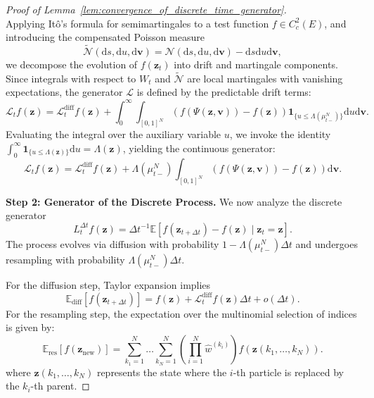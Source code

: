 \documentclass[10pt,a4paper]{amsart}
\newcommand{\dif}{{\mathrm{d}}}
\newcommand{\mathbbm}[1]{\boldsymbol{#1}}
\begin{document}
\begin{proof}[Proof of Lemma~\ref{lem:convergence_of_discrete_time_generator}]
\begin{equation*}
    \end{equation*}
    Applying It\^o's formula for semimartingales to a test function $f \in C_c^2(E)$, and introducing the compensated Poisson measure 
    $$
        \widetilde{\mathcal{N}}(\dif s,\dif u, \dif \mathbbm{v}) = \mathcal{N}(\dif s,\dif u, \dif \mathbbm{v}) - \dif s \dif u \dif \mathbbm{v},
    $$ 
    we decompose the evolution of $f(\mathbbm{z}_t)$ into drift and martingale components. Since integrals with respect to $W_t$ and $\widetilde{\mathcal{N}}$ are local martingales with vanishing expectations, the generator $\mathcal{L}$ is defined by the predictable drift terms:
    \[
    \mathcal{L}_tf(\mathbbm{z}) = \mathcal{L}^{\text{diff}}_tf(\mathbbm{z}) + \int_0^\infty \int_{[0,1]^N} \left( f(\Psi(\mathbbm{z}, \mathbbm{v})) - f(\mathbbm{z}) \right) \mathbbm{1}_{\{u \le \Lambda(\mu^N_{t-})\}} \dif u  \dif \mathbbm{v}.
    \]
    Evaluating the integral over the auxiliary variable $u$, we invoke the identity $\int_0^\infty \mathbbm{1}_{\{u \le \Lambda(\mathbbm{z})\}} \mathrm{d}u = \Lambda(\mathbbm{z})$, yielding the continuous generator:
    \begin{equation*}
    \mathcal{L}_t f(\mathbbm{z}) = \mathcal{L}^{\text{diff}}_t f(\mathbbm{z}) + \Lambda(\mu^N_{t-}) \int_{[0,1]^N} \left( f(\Psi(\mathbbm{z}, \mathbbm{v})) - f(\mathbbm{z}) \right)  \mathrm{d}\mathbbm{v}.
    \end{equation*}
    
    \textbf{Step 2: Generator of the Discrete Process.}
    We now analyze the discrete generator 
    $$
        L^{\Delta t}_t f(\mathbbm{z}) = \Delta t^{-1} \mathbb{E}[f(\mathbbm{z}_{t+\Delta t}) - f(\mathbbm{z}) \mid \mathbbm{z}_t = \mathbbm{z}].
    $$ 
    The process evolves via diffusion with probability $1 - \Lambda(\mu^N_{t-})\Delta t$ and undergoes resampling with probability $\Lambda(\mu^N_{t-})\Delta t$.
    
    For the diffusion step, Taylor expansion implies 
    $$
        \mathbb{E}_{\text{diff}}[f(\mathbbm{z}_{t+\Delta t})] = f(\mathbbm{z}) + \mathcal{L}^{\text{diff}}_t f(\mathbbm{z})\Delta t + o(\Delta t).
    $$ 
    For the resampling step, the expectation over the multinomial selection of indices is given by:
    \[
    \mathbb{E}_{\text{res}}[f(\mathbbm{z}_{\text{new}})] = \sum_{k_1=1}^N \dots \sum_{k_N=1}^N \left( \prod_{i=1}^N \widehat{w}^{(k_i)} \right) f\left( \mathbbm{z}(k_1, \dots, k_N) \right).
    \]
    where $\mathbbm{z}(k_1, \dots, k_N)$ represents the state where the $i$-th particle is replaced by the $k_i$-th parent.
    

\end{proof}
\end{document}
